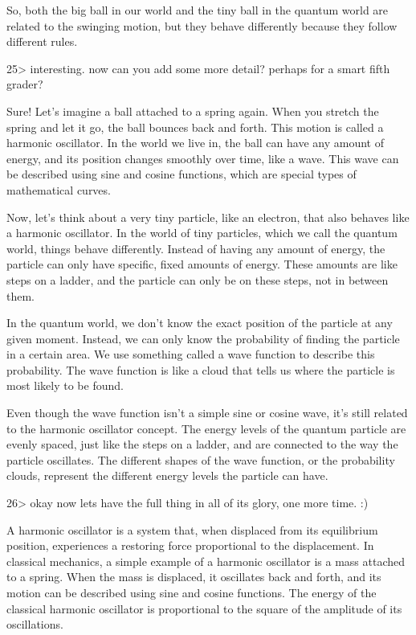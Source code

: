 \documentclass[
]{article}
\begin{document}
So, both the big ball in our world and the tiny ball in the quantum
world are related to the swinging motion, but they behave differently
because they follow different rules.

25\textgreater{} interesting. now can you add some more detail? perhaps
for a smart fifth grader?

Sure! Let's imagine a ball attached to a spring again. When you stretch
the spring and let it go, the ball bounces back and forth. This motion
is called a harmonic oscillator. In the world we live in, the ball can
have any amount of energy, and its position changes smoothly over time,
like a wave. This wave can be described using sine and cosine functions,
which are special types of mathematical curves.

Now, let's think about a very tiny particle, like an electron, that also
behaves like a harmonic oscillator. In the world of tiny particles,
which we call the quantum world, things behave differently. Instead of
having any amount of energy, the particle can only have specific, fixed
amounts of energy. These amounts are like steps on a ladder, and the
particle can only be on these steps, not in between them.

In the quantum world, we don't know the exact position of the particle
at any given moment. Instead, we can only know the probability of
finding the particle in a certain area. We use something called a wave
function to describe this probability. The wave function is like a cloud
that tells us where the particle is most likely to be found.

Even though the wave function isn't a simple sine or cosine wave, it's
still related to the harmonic oscillator concept. The energy levels of
the quantum particle are evenly spaced, just like the steps on a ladder,
and are connected to the way the particle oscillates. The different
shapes of the wave function, or the probability clouds, represent the
different energy levels the particle can have.

26\textgreater{} okay now lets have the full thing in all of its glory,
one more time. :)

A harmonic oscillator is a system that, when displaced from its
equilibrium position, experiences a restoring force proportional to the
displacement. In classical mechanics, a simple example of a harmonic
oscillator is a mass attached to a spring. When the mass is displaced,
it oscillates back and forth, and its motion can be described using sine
and cosine functions. The energy of the classical harmonic oscillator is
proportional to the square of the amplitude of its oscillations.
\end{document}
